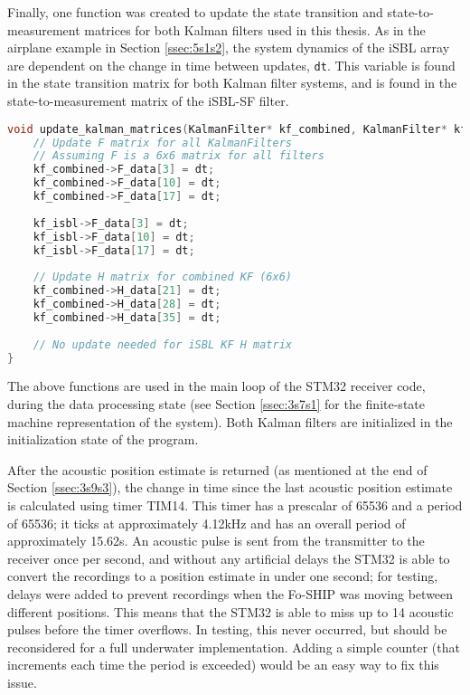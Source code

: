 \documentclass[12pt,a4paper]{report}
\begin{document}
Finally, one function was created to update the state transition and state-to-measurement matrices for both Kalman filters used in this thesis. As in the airplane example in Section \ref{ssec:5s1s2}, the system dynamics of the iSBL array are dependent on the change in time between updates, \verb|dt|. This variable is found in the state transition matrix for both Kalman filter systems, and is found in the state-to-measurement matrix of the iSBL-SF filter.

\begin{lstlisting}[language=C++]
void update_kalman_matrices(KalmanFilter* kf_combined, KalmanFilter* kf_isbl, float32_t dt) {
	// Update F matrix for all KalmanFilters
	// Assuming F is a 6x6 matrix for all filters
	kf_combined->F_data[3] = dt;
	kf_combined->F_data[10] = dt;
	kf_combined->F_data[17] = dt;
	
	kf_isbl->F_data[3] = dt;
	kf_isbl->F_data[10] = dt;
	kf_isbl->F_data[17] = dt;
	
	// Update H matrix for combined KF (6x6)
	kf_combined->H_data[21] = dt;
	kf_combined->H_data[28] = dt;
	kf_combined->H_data[35] = dt;
	
	// No update needed for iSBL KF H matrix
}
\end{lstlisting}

The above functions are used in the main loop of the STM32 receiver code, during the data processing state (see Section \ref{ssec:3s7s1} for the finite-state machine representation of the system). Both Kalman filters are initialized in the initialization state of the program.

After the acoustic position estimate is returned (as mentioned at the end of Section \ref{ssec:3s9s3}), the change in time since the last acoustic position estimate is calculated using timer TIM14. This timer has a prescalar of 65536 and a period of 65536; it ticks at approximately 4.12kHz and has an overall period of approximately 15.62s. An acoustic pulse is sent from the transmitter to the receiver once per second, and without any artificial delays the STM32 is able to convert the recordings to a position estimate in under one second; for testing, delays were added to prevent recordings when the Fo-SHIP was moving between different positions. This means that the STM32 is able to miss up to 14 acoustic pulses before the timer overflows. In testing, this never occurred, but should be reconsidered for a full underwater implementation. Adding a simple counter (that increments each time the period is exceeded) would be an easy way to fix this issue.
\end{document}
